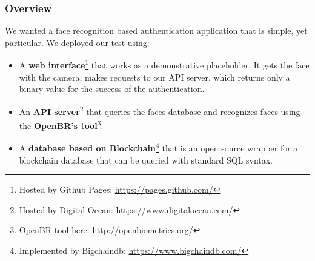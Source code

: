 \begin{frame} \frametitle{Overview}
We wanted a face recognition based authentication application that is simple, 
yet particular. We deployed our test using:

\begin{itemize}
	\item A \textbf{web interface}\footnote{Hosted by Github Pages: 
	{\color{red}\url{https://pages.github.com/}}} that works as a 
	demonstrative placeholder. It gets the face with the camera, makes 
	requests to our API server, which returns only a binary value for the 
	success of the authentication.
	
	\item An \textbf{API server}\footnote{Hosted by Digital Ocean: 
	{\color{red} \url{https://www.digitalocean.com/}}} that queries the 
	faces database and recognizes faces using the \textbf{OpenBR's 
	tool}\footnote{OpenBR tool here: {\color{red} 
	\url{http://openbiometrics.org/}}}.
	
	\item A \textbf{database based on Blockchain}\footnote{Implemented by 
	Bigchaindb: {\color{red} \url{https://www.bigchaindb.com/}}} that is an
	open source wrapper for a blockchain database that can be queried with 
	standard SQL syntax.
\end{itemize}

\end{frame}